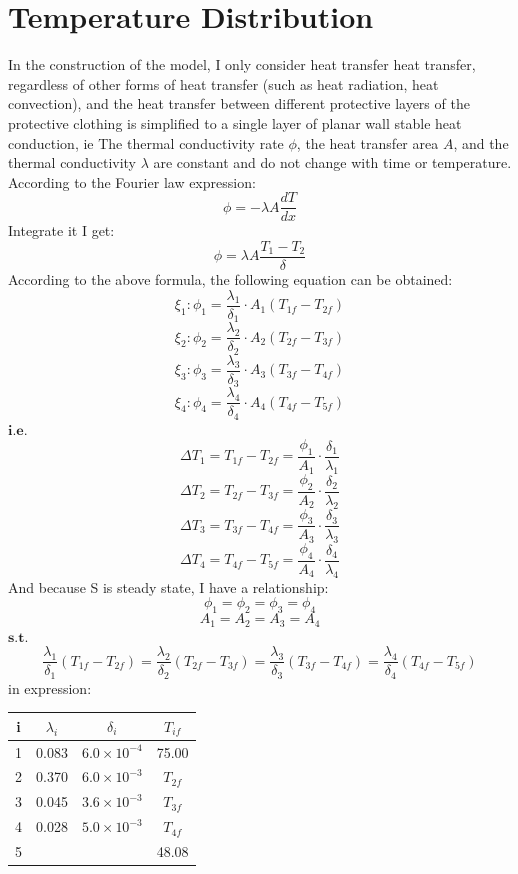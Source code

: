 \documentclass[12pt]{ctexart}
\begin{document}
\section{Temperature Distribution}
In the construction of the model, I only consider heat transfer heat transfer, regardless of other forms of heat transfer (such as heat radiation, heat convection), and the heat transfer between different protective layers of the protective clothing is simplified to a single layer of planar wall stable heat conduction, ie The thermal conductivity rate $\phi$, the heat transfer area $A$, and the thermal conductivity $\lambda$ are constant and do not change with time or temperature.\\
\indent According to the Fourier law expression\cite{volz1996transient}:
\[\phi = -\lambda A\frac{dT}{dx}\]
\indent Integrate it I get:\\
\[\phi = \lambda A\frac{T_{1}-T_{2}}{\delta}\]
\indent According to the above formula, the following equation can be obtained\cite{li2004fourier}:\\
    \[\xi_1 : \phi_{1} = \frac{\lambda_{1}}{\delta_{1}}\cdot A_{1}(T_{1f}-T_{2f})\]
    \[\xi_2 : \phi_{2} = \frac{\lambda_{2}}{\delta_{2}}\cdot A_{2}(T_{2f}-T_{3f})\]
    \[\xi_3 : \phi_{3} = \frac{\lambda_{3}}{\delta_{3}}\cdot A_{3}(T_{3f}-T_{4f})\]
    \[\xi_4 : \phi_{4} = \frac{\lambda_{4}}{\delta_{4}}\cdot A_{4}(T_{4f}-T_{5f})\]
\indent $\textbf{i.e.}$\\
    \[\Delta T_{1} = T_{1f}-T_{2f}= \frac{\phi_{1}}{A_{1}}\cdot \frac{\delta_{1}}{\lambda_{1}}\]
    \[\Delta T_{2} = T_{2f}-T_{3f}= \frac{\phi_{2}}{A_{2}}\cdot \frac{\delta_{2}}{\lambda_{2}}\]
    \[\Delta T_{3} = T_{3f}-T_{4f}= \frac{\phi_{3}}{A_{3}}\cdot \frac{\delta_{3}}{\lambda_{3}}\]
    \[\Delta T_{4} = T_{4f}-T_{5f}= \frac{\phi_{4}}{A_{4}}\cdot \frac{\delta_{4}}{\lambda_{4}}\]
\indent And because S is steady state, I have a relationship:\\
    \[\phi_{1} = \phi_{2} = \phi_{3} = \phi_{4}\]
    \[A_{1} = A_{2} = A_{3} = A_{4}\]
\indent $\textbf{s.t.}$\\
    \[\frac{\lambda_{1}}{\delta_{1}}(T_{1f}-T_{2f}) = \frac{\lambda_{2}}{\delta_{2}}(T_{2f}-T_{3f}) = \frac{\lambda_{3}}{\delta_{3}}(T_{3f}-T_{4f}) = \frac{\lambda_{4}}{\delta_{4}}(T_{4f}-T_{5f})\]
\indent in expression:\\
\begin{center}
\begin{tabular}{|c|c|c|c|}
\toprule
    i & $\lambda_{i}$ & $\delta_{i}$ & $T_{if}$\\
\midrule
    1 & 0.083 & $6.0\times 10^{-4}$ & 75.00\\
\midrule
    2 & 0.370 & $6.0\times 10^{-3}$ & $T_{2f}$\\
\midrule
    3 & 0.045 & $3.6\times 10^{-3}$ & $T_{3f}$\\
\midrule
    4 & 0.028 & $5.0\times 10^{-3}$ & $T_{4f}$\\
\midrule
    5 & & & 48.08\\
\midrule
\bottomrule
\end{tabular}
\end{center}
\end{document}
